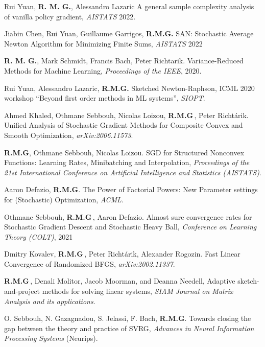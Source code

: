 \begin{bibsection}
\item Rui Yuan, {\bf R. M. G.}, Alessandro Lazaric A general sample complexity analysis of vanilla policy gradient, \emph{AISTATS} 2022.

\item  Jiabin Chen, Rui Yuan, Guillaume Garrigos,  {\bf R.M.G.} SAN: Stochastic Average Newton Algorithm for Minimizing Finite Sums, \emph{AISTATS} 2022


\item[2020]  {\bf R. M. G.}, Mark Schmidt, Francis Bach, Peter Richtarik. Variance-Reduced Methods for Machine Learning,  \emph{Proceedings of the IEEE}, 2020.

\item  Rui Yuan, Alessandro Lazaric, {\bf R.M.G.} Sketched Newton-Raphson, ICML 2020 workshop ``Beyond first order methods in ML systems'', \emph{SIOPT}.

\item Ahmed Khaled, Othmane Sebbouh, Nicolas Loizou, {\bf R.M.G}\,, Peter Richtárik. Unified Analysis of Stochastic Gradient Methods for Composite Convex and Smooth Optimization, \emph{arXiv:2006.11573}.

\item {\bf R.M.G}, Othmane Sebbouh, Nicolas Loizou. SGD for Structured Nonconvex Functions: Learning Rates, Minibatching and Interpolation,  \emph{Proceedings of the 21st International Conference on Artificial Intelligence and Statistics (AISTATS)}.

\item Aaron Defazio, {\bf R.M.G}. The Power of Factorial Powers: New Parameter settings for (Stochastic) Optimization, \emph{ACML}.

\item Othmane Sebbouh, {\bf R.M.G}\,, Aaron Defazio. Almost sure convergence rates for Stochastic Gradient Descent and Stochastic Heavy Ball, \emph{Conference on Learning Theory (COLT)}, 2021

\item Dmitry Kovalev, {\bf R.M.G}\,, Peter Richtárik, Alexander Rogozin. Fast Linear Convergence of Randomized BFGS, \emph{arXiv:2002.11337}.

\item[2019] { \bf R.M.G}\,,  Denali Molitor, Jacob Moorman, and Deanna Needell,  Adaptive sketch-and-project methods for solving linear systems, \emph{SIAM Journal on Matrix Analysis and its applications}.


\item O. Sebbouh, N. Gazagnadou, S. Jelassi, F. Bach, { \bf R.M.G}. Towards closing the gap between the theory and practice of SVRG, \emph{ Advances in Neural Information Processing Systems} (Neurips).



\end{bibsection}
